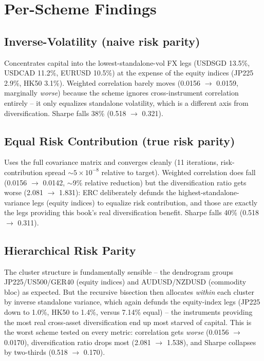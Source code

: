\documentclass[11pt]{article}
\begin{document}
\section*{Per-Scheme Findings}

\subsection*{Inverse-Volatility (naive risk parity)}
Concentrates capital into the lowest-standalone-vol FX legs (USDSGD 13.5\%, USDCAD 11.2\%, EURUSD 10.5\%) at the expense of the equity indices (JP225 2.9\%, HK50 3.1\%). Weighted correlation barely moves (0.0156 $\to$ 0.0159, marginally \emph{worse}) because the scheme ignores cross-instrument correlation entirely -- it only equalizes standalone volatility, which is a different axis from diversification. Sharpe falls 38\% (0.518 $\to$ 0.321).

\subsection*{Equal Risk Contribution (true risk parity)}
Uses the full covariance matrix and converges cleanly (11 iterations, risk-contribution spread $\sim 5\times10^{-8}$ relative to target). Weighted correlation does fall (0.0156 $\to$ 0.0142, $\sim$9\% relative reduction) but the diversification ratio gets worse (2.081 $\to$ 1.831): ERC deliberately defunds the highest-standalone-variance legs (equity indices) to equalize risk contribution, and those are exactly the legs providing this book's real diversification benefit. Sharpe falls 40\% (0.518 $\to$ 0.311).

\subsection*{Hierarchical Risk Parity}
The cluster structure is fundamentally sensible -- the dendrogram groups JP225/US500/GER40 (equity indices) and AUDUSD/NZDUSD (commodity bloc) as expected. But the recursive bisection then allocates \emph{within} each cluster by inverse standalone variance, which again defunds the equity-index legs (JP225 down to 1.0\%, HK50 to 1.4\%, versus 7.14\% equal) -- the instruments providing the most real cross-asset diversification end up most starved of capital. This is the worst scheme tested on every metric: correlation gets \emph{worse} (0.0156 $\to$ 0.0170), diversification ratio drops most (2.081 $\to$ 1.538), and Sharpe collapses by two-thirds (0.518 $\to$ 0.170).
\end{document}
